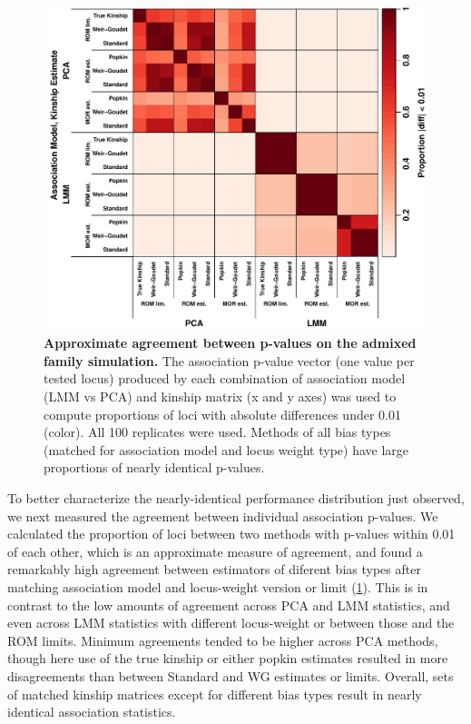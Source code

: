 \documentclass[11pt]{article}
\begin{document}
\begin{figure}[bp!]
  \centering
  \includegraphics[width=\textwidth]{sim-admix-n1000-m100000-k3-f0.3-s0.5-mc100-h0.8-g20-fes/pvals_eq.pdf}
  \caption{
    {\bf Approximate agreement between p-values on the admixed family simulation.}
    The association p-value vector (one value per tested locus) produced by each combination of association model (LMM vs PCA) and kinship matrix (x and y axes) was used to compute proportions of loci with absolute differences under 0.01 (color).
    All 100 replicates were used.
    Methods of all bias types (matched for association model and locus weight type) have large proportions of nearly identical p-values.
    }
  \label{fig:pvals_eq_sim}
\end{figure}

To better characterize the nearly-identical performance distribution just observed, we next measured the agreement between individual association p-values.
We calculated the proportion of loci between two methods with p-values within 0.01 of each other, which is an approximate measure of agreement, and found a remarkably high agreement between estimators of diferent bias types after matching association model and locus-weight version or limit (\cref{fig:pvals_eq_sim}).
This is in contrast to the low amounts of agreement across PCA and LMM statistics, and even across LMM statistics with different locus-weight or between those and the ROM limits.
Minimum agreements tended to be higher across PCA methods, though here use of the true kinship or either popkin estimates resulted in more disagreements than between Standard and WG estimates or limits.
Overall, sets of matched kinship matrices except for different bias types result in nearly identical association statistics.
\end{document}
